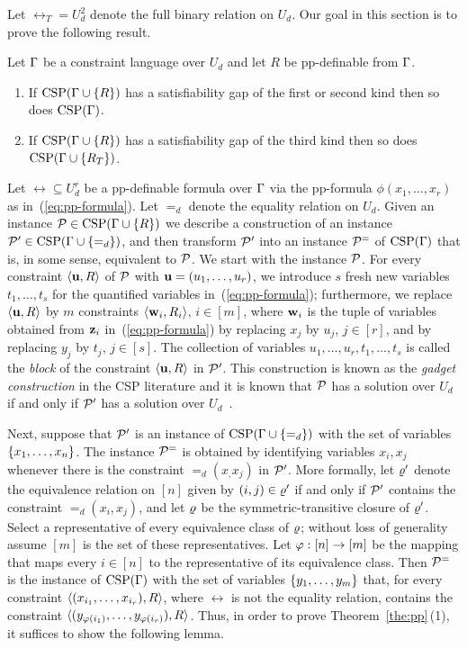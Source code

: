 \documentclass[11pt,letter]{article}
\begin{document}
Let $\rel_T=U_d^2$ denote the full binary relation on $U_d$.
Our goal in this section is to prove the following result.

\begin{theorem}\label{the:pp}
  Let $\Gamma$ be a constraint language over $U_d$ and let $R$ be pp-definable from
  $\Gamma$.
  \begin{enumerate}
    \item If ${\rm CSP}(\Gamma\cup\{R\})$ has a satisfiability gap of the first or second kind then so does ${\rm CSP}(\Gamma)$.
    \item If ${\rm CSP}(\Gamma\cup\{R\})$ has a satisfiability gap of the third kind then so does ${\rm CSP}(\Gamma\cup\{R_T\})$.
  \end{enumerate}
\end{theorem}

Let $\rel\subseteq U_d^r$ be a pp-definable formula
over $\Gamma$ via the pp-formula $\phi(x_1,\ldots,x_r)$ as
in~(\ref{eq:pp-formula}). Let $=_d$ denote the equality relation on $U_d$. 
Given an instance
${\mathcal P}\in{\rm CSP}(\Gamma\cup\{R\})$ we describe a construction of an instance
${\mathcal P}'\in{\rm CSP}(\Gamma\cup\{=_d\})$, and then transform ${\mathcal P}'$ into an instance ${\mathcal P}^=$ of ${\rm CSP}(\Gamma)$ that is, in some sense, equivalent to ${\mathcal P}$. 
We start with the instance ${\mathcal P}$. For every constraint $\langle {\bf u},R \rangle$ of ${\mathcal P}$ with
${\bf u}=(u_1,\ldots,u_r)$, we
introduce $s$ fresh new variables $t_1,\ldots,t_s$ for the quantified
variables in~(\ref{eq:pp-formula}); furthermore, we replace $\langle {\bf u},R \rangle$ by $m$ constraints
$\langle {\bf w}_i,R_i \rangle$, $i\in [m]$, where ${\bf w}_i$ is the tuple of variables obtained
from ${\bf z}_i$ in~(\ref{eq:pp-formula}) by replacing $x_j$ by $u_j$, $j\in [r]$,
and by replacing $y_j$ by $t_j$, $j\in [s]$.
The collection of variables $u_1,\ldots,u_r,t_1,\ldots,t_s$ is called the
\emph{block} of the constraint $\langle {\bf u},R \rangle$ in ${\mathcal P}'$.
This construction is known as the \emph{gadget construction} in the CSP
literature and it is known that ${\mathcal P}$ has a solution over $U_d$
if and only if ${\mathcal P}'$ has a solution over $U_d$~\cite{Bulatov05:classifying,BKW17}.

Next, suppose that ${\mathcal P}'$ is an instance of ${\rm CSP}(\Gamma\cup\{=_d\})$ with the set of variables $\{x _1,\ldots, x _{n}\}$. The instance ${\mathcal P}^=$ is obtained by identifying variables $x_i,x_j$ whenever there is the constraint $=_d(x_,x_j)$ in ${\mathcal P}'$. More formally, let $\varrho'$ denote the equivalence relation on $[n]$ given by $(i,j)\in\varrho'$ if and only if ${\mathcal P}'$ contains the constraint $=_d(x_i,x_j)$, and let $\varrho$ be the symmetric-transitive closure of $\varrho'$. Select a representative of every equivalence class of $\varrho$; without loss of generality assume $[m]$ is the set of these representatives. Let $\varphi:[n]\to[m]$ be the mapping that maps every $i\in[n]$ to the representative of its equivalence class. Then ${\mathcal P}^=$ is the instance of ${\rm CSP}(\Gamma)$ with the set of variables $\{y _1,\ldots, y _{m}\}$ that, for every constraint $\langle (x_{i_1},\ldots, x_{i_r}),R \rangle$, where $\rel$ is not the equality relation, contains the constraint $\langle (y_{\varphi(i_1)},\ldots, y_{\varphi(i_r)}),R \rangle$.
Thus, in order to prove Theorem~\ref{the:pp}\,(1), it suffices to show the following lemma.
\end{document}
